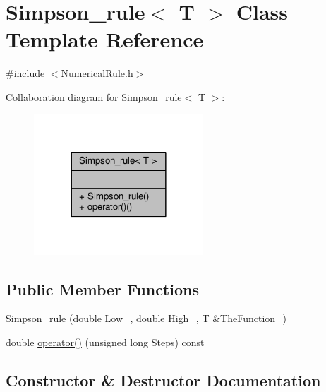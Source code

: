 \hypertarget{classSimpson__rule}{}\section{Simpson\+\_\+rule$<$ T $>$ Class Template Reference}
\label{classSimpson__rule}


{\ttfamily \#include $<$Numerical\+Rule.\+h$>$}



Collaboration diagram for Simpson\+\_\+rule$<$ T $>$\+:
\nopagebreak
\begin{figure}[H]
\begin{center}
\leavevmode
\includegraphics[width=180pt]{classSimpson__rule__coll__graph}
\end{center}
\end{figure}
\subsection*{Public Member Functions}
\begin{DoxyCompactItemize}
\item 
\hyperlink{classSimpson__rule_a83f1004fbf6ab0d1a888e3219b4a9cbd}{Simpson\+\_\+rule} (double Low\+\_\+, double High\+\_\+, T \&The\+Function\+\_\+)
\item 
double \hyperlink{classSimpson__rule_a2b8f2e5cdac22f5b5c4bc924eab46db6}{operator()} (unsigned long Steps) const
\end{DoxyCompactItemize}


\subsection{Constructor \& Destructor Documentation}
\hypertarget{classSimpson__rule_a83f1004fbf6ab0d1a888e3219b4a9cbd}{}\label{classSimpson__rule_a83f1004fbf6ab0d1a888e3219b4a9cbd} 
